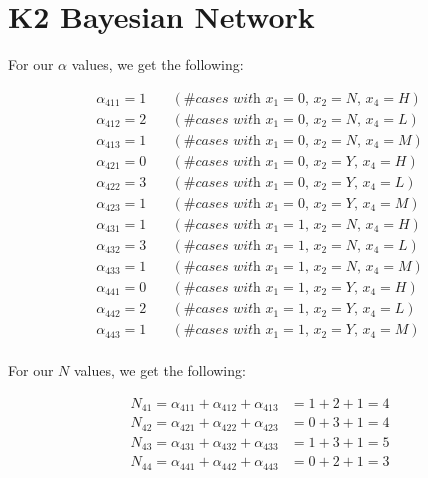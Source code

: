 \documentclass[12pt]{scrartcl}
\begin{document}
\section{K2 Bayesian Network}
For our $\alpha$ values, we get the following:

\begin{align*}
    \alpha_{411} = 1 &\quad(\textit{\# cases with $x_1 = 0$, $x_2 = N$, $x_4 = H$}) \\
    \alpha_{412} = 2 &\quad(\textit{\# cases with $x_1 = 0$, $x_2 = N$, $x_4 = L$}) \\
    \alpha_{413} = 1 &\quad(\textit{\# cases with $x_1 = 0$, $x_2 = N$, $x_4 = M$}) \\
    \alpha_{421} = 0 &\quad(\textit{\# cases with $x_1 = 0$, $x_2 = Y$, $x_4 = H$}) \\
    \alpha_{422} = 3 &\quad(\textit{\# cases with $x_1 = 0$, $x_2 = Y$, $x_4 = L$}) \\
    \alpha_{423} = 1 &\quad(\textit{\# cases with $x_1 = 0$, $x_2 = Y$, $x_4 = M$}) \\
    \alpha_{431} = 1 &\quad(\textit{\# cases with $x_1 = 1$, $x_2 = N$, $x_4 = H$}) \\
    \alpha_{432} = 3 &\quad(\textit{\# cases with $x_1 = 1$, $x_2 = N$, $x_4 = L$}) \\
    \alpha_{433} = 1 &\quad(\textit{\# cases with $x_1 = 1$, $x_2 = N$, $x_4 = M$}) \\
    \alpha_{441} = 0 &\quad(\textit{\# cases with $x_1 = 1$, $x_2 = Y$, $x_4 = H$}) \\
    \alpha_{442} = 2 &\quad(\textit{\# cases with $x_1 = 1$, $x_2 = Y$, $x_4 = L$}) \\
    \alpha_{443} = 1 &\quad(\textit{\# cases with $x_1 = 1$, $x_2 = Y$, $x_4 = M$}) \\
\end{align*}

For our $N$ values, we get the following:

\begin{align*}
    N_{41} = \alpha_{411} + \alpha_{412} + \alpha_{413} &= 1 + 2 + 1 = 4\\
    N_{42} = \alpha_{421} + \alpha_{422} + \alpha_{423} &= 0 + 3 + 1 = 4\\
    N_{43} = \alpha_{431} + \alpha_{432} + \alpha_{433} &= 1 + 3 + 1 = 5\\
    N_{44} = \alpha_{441} + \alpha_{442} + \alpha_{443} &= 0 + 2 + 1 = 3\\
\end{align*}
\end{document}
